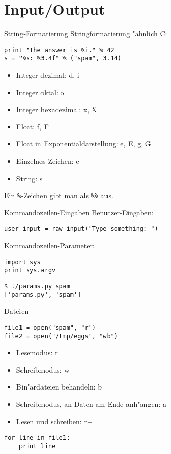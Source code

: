 \section{Input/Output}

\begin{frame}[fragile]{String-Formatierung}
Stringformatierung "ahnlich C: 
\begin{lstlisting}[style=Python]
print "The answer is %i." % 42
s = "%s: %3.4f" % ("spam", 3.14)
\end{lstlisting}
\begin{itemize}
\item \alert{Integer dezimal}: d, i
\item Integer oktal: o
\item Integer hexadezimal: x, X
\item \alert{Float}: f, F
\item Float in Exponentialdarstellung: e, E, g, G
\item Einzelnes Zeichen: c
\item \alert{String}: s
\end{itemize}
Ein \texttt{\%}-Zeichen gibt man als \texttt{\%\%} aus.
\end{frame}

\begin{frame}[fragile]{Kommandozeilen-Eingaben}
Benutzer-Eingaben:
\begin{lstlisting}[style=Python]
user_input = raw_input("Type something: ")
\end{lstlisting}
\vspace{3mm}
Kommandozeilen-Parameter:
\begin{lstlisting}[style=Python]
import sys
print sys.argv
\end{lstlisting}
\begin{lstlisting}[style=Shell]
$ ./params.py spam
['params.py', 'spam']
\end{lstlisting} %
\end{frame}

\begin{frame}[fragile]{Dateien}
\begin{lstlisting}[style=Python]
file1 = open("spam", "r")
file2 = open("/tmp/eggs", "wb")
\end{lstlisting}
\begin{itemize}
\item Lesemodus: r
\item Schreibmodus: w
\item Bin"ardateien behandeln: b
\item Schreibmodus, an Daten am Ende anh"angen: a
\item Lesen und schreiben: r+
\end{itemize}
\begin{lstlisting}
for line in file1:
    print line
\end{lstlisting}
\end{frame}

